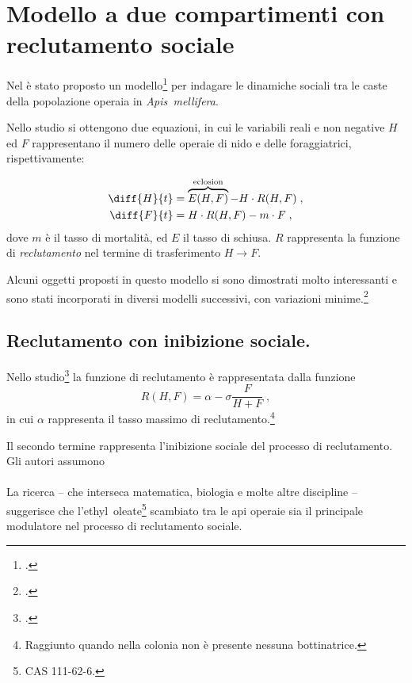 \section[Modello a due compartimenti con reclutamento]{Modello a due compartimenti con reclutamento sociale}
\label{sec:kh11}

Nel \citeyear{khoury2011} è stato proposto un modello\footcite{khoury2011} per indagare le dinamiche sociali
tra le caste della popolazione operaia in \emph{Apis~mellifera}.

Nello studio si ottengono due equazioni, in cui le variabili reali e non negative $H$ ed $F$ rappresentano
il numero delle operaie di nido e delle foraggiatrici, rispettivamente:

\begin{align}
    \diff{H}{t} &= \overbrace{E(H,F)}^{\text{eclosion}}- H \cdot R(H,F) \label{eq:kh11h} \; , \\
    \diff{F}{t} &= H \cdot R(H,F)  - m \cdot F \label{eq:kh11f} \; ,
\end{align}
dove $m$ è il tasso di mortalità, ed $E$ il tasso di schiusa.
$R$ rappresenta la funzione di \emph{reclutamento} nel termine di
trasferimento $H \to F$.

Alcuni oggetti proposti in questo modello si sono dimostrati molto interessanti e sono stati incorporati
in diversi modelli successivi, con variazioni minime.\footcite{ratti2017}

\subsection{Reclutamento con inibizione sociale.}
Nello studio\footcite{khoury2011} la funzione di reclutamento è rappresentata dalla funzione
\begin{equation}
    \label{eq:Recr}
    R(H,F) = \alpha - \sigma \frac{F}{H+F} \; ,
\end{equation}
in cui $\alpha$ rappresenta il tasso massimo di reclutamento.\footnote{Raggiunto quando nella colonia non è
presente nessuna bottinatrice.}

Il secondo termine rappresenta l'inibizione sociale del processo di reclutamento.
Gli autori assumono

\paragraph{}
La ricerca -- che interseca matematica, biologia e molte altre discipline -- suggerisce che
l'ethyl~oleate\footnote{CAS 111-62-6.} %
scambiato tra le api operaie sia il principale modulatore nel processo di reclutamento sociale.


